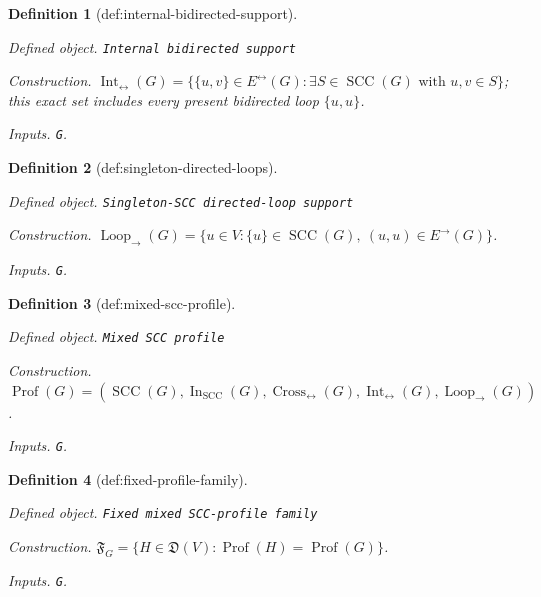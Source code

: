 \documentclass{article}
\newtheorem{definition}{Definition}
\begin{document}
\begin{definition}[def:internal-bidirected-support]\label{def:internal-bidirected-support}
\par\smallskip\noindent\emph{Defined object.} \texttt{Internal bidirected support}
\par\smallskip\noindent\emph{Construction.} \(\operatorname{Int}_{\leftrightarrow}(G)=\{\{u,v\}\in E^{\leftrightarrow}(G):\exists S\in\operatorname{SCC}(G)\text{ with }u,v\in S\}\); this exact set includes every present bidirected loop \(\{u,u\}\).
\par\smallskip\noindent\emph{Inputs.} \texttt{G}.
\end{definition}

\begin{definition}[def:singleton-directed-loops]\label{def:singleton-directed-loops}
\par\smallskip\noindent\emph{Defined object.} \texttt{Singleton-\allowbreak{}SCC directed-\allowbreak{}loop support}
\par\smallskip\noindent\emph{Construction.} \(\operatorname{Loop}_{\to}(G)=\{u\in V:\{u\}\in\operatorname{SCC}(G),\ (u,u)\in E^{\to}(G)\}\).
\par\smallskip\noindent\emph{Inputs.} \texttt{G}.
\end{definition}

\begin{definition}[def:mixed-scc-profile]\label{def:mixed-scc-profile}
\par\smallskip\noindent\emph{Defined object.} \texttt{Mixed SCC profile}
\par\smallskip\noindent\emph{Construction.} \(\operatorname{Prof}(G)=(\operatorname{SCC}(G),\operatorname{In}_{\mathrm{SCC}}(G),\operatorname{Cross}_{\leftrightarrow}(G),\operatorname{Int}_{\leftrightarrow}(G),\operatorname{Loop}_{\to}(G))\).
\par\smallskip\noindent\emph{Inputs.} \texttt{G}.
\end{definition}

\begin{definition}[def:fixed-profile-family]\label{def:fixed-profile-family}
\par\smallskip\noindent\emph{Defined object.} \texttt{Fixed mixed SCC-\allowbreak{}profile family}
\par\smallskip\noindent\emph{Construction.} \(\mathfrak F_G=\{H\in\mathfrak D(V):\operatorname{Prof}(H)=\operatorname{Prof}(G)\}\).
\par\smallskip\noindent\emph{Inputs.} \texttt{G}.
\end{definition}
\end{document}
